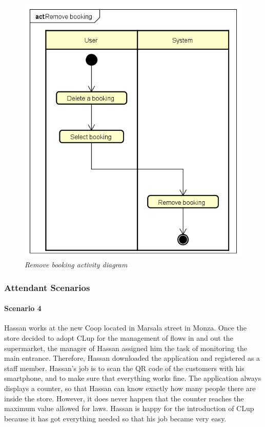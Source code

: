 \documentclass[table, 12pt]{article}
\begin{document}
\newpage
\begin{figure}[H]
    \centering
    \includegraphics[scale=0.5]{assets/Activity-Diagrams/act_remove.png}
    \caption{\textit{Remove booking activity diagram}}
\end{figure}



\subsubsection{Attendant Scenarios}
\paragraph{Scenario 4}

Hassan works at the new Coop located in Marsala street in Monza. Once the store decided to adopt CLup for the management of flows in and out the supermarket, the manager of Hassan assigned him the task of monitoring the main entrance. Therefore, Hassan downloaded the application and registered as a staff member. Hassan's job is to scan the QR code of the customers with his smartphone, and to make sure that everything works fine. The application always displays a counter, so that Hassan can know exactly how many people there are inside the store. However, it does never happen that the counter reaches the maximum value allowed for laws. Hassan is happy for the introduction of CLup because it has got everything needed so that his job became very easy.
\end{document}
